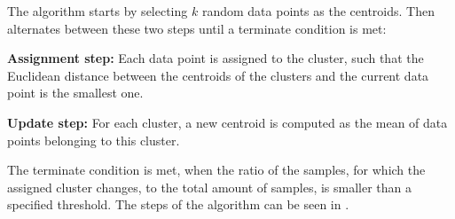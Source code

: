 The algorithm starts by selecting $k$ random data points as the centroids. Then alternates between these two steps until a terminate condition is met:
\begin{description}
    \item{\textbf{Assignment step:}} Each data point is assigned to the cluster, such that the Euclidean distance between the centroids of the clusters and the current data point is the smallest one.
    \item{\textbf{Update step:}} For each cluster, a new centroid is computed as the mean of data points belonging to this cluster.
\end{description}

The terminate condition is met, when the ratio of the samples, for which the assigned cluster changes, to the total amount of samples, is smaller than a specified threshold. The steps of the algorithm can be seen in .
